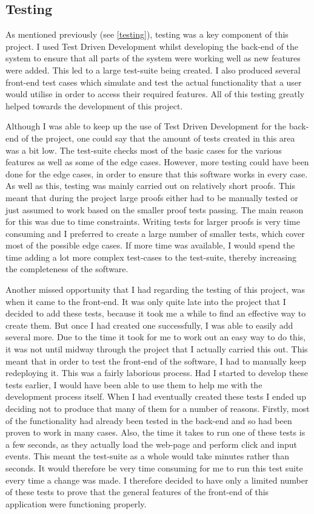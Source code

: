 \subsection{Testing}
As mentioned previously (see \ref{testing}), testing was a key component of this project. I used Test Driven Development whilst developing the back-end of the system to ensure that all parts of the system were working well as new features were added. This led to a large test-suite being created. I also produced several front-end test cases which simulate and test the actual functionality that a user would utilise in order to access their required features. All of this testing greatly helped towards the development of this project.

Although I was able to keep up the use of Test Driven Development for the back-end of the project, one could say that the amount of tests created in this area was a bit low. The test-suite checks most of the basic cases for the various features as well as some of the edge cases. However, more testing could have been done for the edge cases, in order to ensure that this software works in every case. As well as this, testing was mainly carried out on relatively short proofs. This meant that during the project large proofs either had to be manually tested or just assumed to work based on the smaller proof tests passing. The main reason for this was due to time constraints. Writing tests for larger proofs is very time consuming and I preferred to create a large number of smaller tests, which cover most of the possible edge cases. If more time was available, I would spend the time adding a lot more complex test-cases to the test-suite, thereby increasing the completeness of the software.

Another missed opportunity that I had regarding the testing of this project, was when it came to the front-end. It was only quite late into the project that I decided to add these tests, because it took me a while to find an effective way to create them. But once I had created one successfully, I was able to easily add several more. Due to the time it took for me to work out an easy way to do this, it was not until midway through the project that I actually carried this out. This meant that in order to test the front-end of the software, I had to manually keep redeploying it. This was a fairly laborious process. Had I started to develop these tests earlier, I would have been able to use them to help me with the development process itself. When I had eventually created these tests I ended up deciding not to produce that many of them for a number of reasons. Firstly, most of the functionality had already been tested in the back-end and so had been proven to work in many cases. Also, the time it takes to run one of these tests is a few seconds, as they actually load the web-page and perform click and input events. This meant the test-suite as a whole would take minutes rather than seconds. It would therefore be very time consuming for me to run this test suite every time a change was made. I therefore decided to have only a limited number of these tests to prove that the general features of the front-end of this application were functioning properly.

